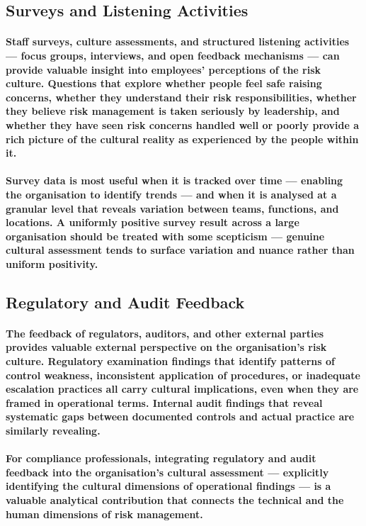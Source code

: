 \subsection{Surveys and Listening Activities}
\paragraph{Staff surveys, culture assessments, and structured listening activities — focus groups, interviews, and open feedback mechanisms — can provide valuable insight into employees' perceptions of the risk culture. Questions that explore whether people feel safe raising concerns, whether they understand their risk responsibilities, whether they believe risk management is taken seriously by leadership, and whether they have seen risk concerns handled well or poorly provide a rich picture of the cultural reality as experienced by the people within it.}
\paragraph{Survey data is most useful when it is tracked over time — enabling the organisation to identify trends — and when it is analysed at a granular level that reveals variation between teams, functions, and locations. A uniformly positive survey result across a large organisation should be treated with some scepticism — genuine cultural assessment tends to surface variation and nuance rather than uniform positivity.}

\subsection{Regulatory and Audit Feedback}
\paragraph{The feedback of regulators, auditors, and other external parties provides valuable external perspective on the organisation's risk culture. Regulatory examination findings that identify patterns of control weakness, inconsistent application of procedures, or inadequate escalation practices all carry cultural implications, even when they are framed in operational terms. Internal audit findings that reveal systematic gaps between documented controls and actual practice are similarly revealing.}
\paragraph{For compliance professionals, integrating regulatory and audit feedback into the organisation's cultural assessment — explicitly identifying the cultural dimensions of operational findings — is a valuable analytical contribution that connects the technical and the human dimensions of risk management.}

